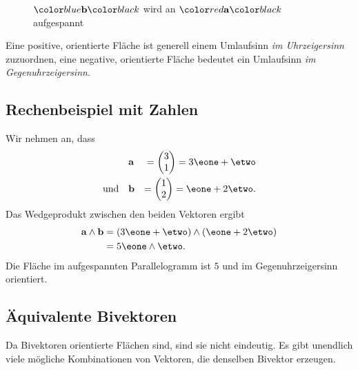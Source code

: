 \begin{figure}
\begin{center}


\end{center}
  \caption{$\bcolored$ wird an $\acolored$ aufgespannt}\label{geoalgebra:fig:aufspannende-flaeche-v2-v1}
\end{figure}

Eine positive, orientierte Fläche ist generell einem Umlaufsinn \emph{im Uhrzeigersinn}
zuzuordnen, eine negative, orientierte Fläche bedeutet ein Umlaufsinn \emph{im Gegenuhrzeigersinn}.


\subsection{Rechenbeispiel mit Zahlen}
\label{geoalgebra:section:example}

Wir nehmen an, dass 
\begin{equation}
  \begin{aligned}
    &\mathbf{a} &= \begin{pmatrix} 3 \\ 1 \end{pmatrix} = 3 \eone + \etwo \\
    \text{und}\quad
    &\mathbf{b} &= \begin{pmatrix} 1 \\ 2 \end{pmatrix} = \eone + 2 \etwo.
  \end{aligned}
\end{equation}
Das Wedgeprodukt zwischen den beiden Vektoren ergibt
\begin{equation}
  \begin{aligned}
    \mathbf{a} \wedge \mathbf{b} &= (3 \eone + \etwo) \wedge (\eone + 2 \etwo) \\
    &= 5 \eone \wedge \etwo.
  \end{aligned}
\end{equation}
Die Fläche im aufgespannten Parallelogramm ist $5$ und im Gegenuhrzeigersinn orientiert.

\subsection{Äquivalente Bivektoren}
Da Bivektoren orientierte Flächen sind, sind sie nicht eindeutig. Es gibt unendlich viele mögliche Kombinationen von Vektoren,
die denselben Bivektor erzeugen.

